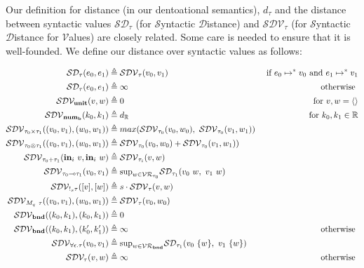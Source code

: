 Our definition for distance (in our dentoational semantics), $d_\tau$ and the
distance between syntactic values $\mathcal{SD}_\tau$ (for $\mathcal{S}$yntactic
$\mathcal{D}$istance) and $\mathcal{SDV}_\tau$ (for $\mathcal{S}$yntactic
$\mathcal{D}$istance for $\mathcal{V}$alues) are closely related. Some care is
needed to ensure that it is well-founded. We define our distance over syntactic
values as follows:

\begin{definition}
  \begin{equation}
  \begin{aligned}[c]
    \mathcal{SD_{\tau}}(e_0, e_1) &\triangleq \mathcal{SDV}_{\tau}(v_0, v_1)
    &\text{ if } e_0 \mapsto^{*} v_0 \text{ and } e_1 \mapsto^{*} v_1 \\
    \mathcal{SD_{\tau}}(e_0, e_1) &\triangleq \infty &\text{ otherwise } \\
    \mathcal{SDV_{\mathbf{unit}}}(v, w) &\triangleq 0 &\text{ for } v, w =
      \langle \rangle \\
    \mathcal{SDV}_{\mathbf{num_{b}}}(k_0, k_1) &\triangleq 
      d_\mathbb{R} &\text{ for } k_0, k_1 \in \mathbb{R} \\
    \mathcal{SDV}_{\tau_0 \times \tau_1}((v_0, v_1), (w_0, w_1)) 
      &\triangleq max(\mathcal{SDV}_{\tau_0}(v_0, w_0),~\mathcal{SDV}_{\tau_0}(v_1, w_1))
    \\
    \mathcal{SDV}_{\tau_0 \otimes \tau_1}((v_0, v_1), (w_0, w_1)) 
      &\triangleq \mathcal{SDV}_{\tau_0}(v_0, w_0) + \mathcal{SDV}_{\tau_0}(v_1, w_1))
    \\
    \mathcal{SDV}_{\tau_0 + \tau_1}(\textbf{in}_i~v, \textbf{in}_i~w) 
      &\triangleq \mathcal{SDV}_{\tau_i}(v, w)
    \\
    \mathcal{SDV}_{\tau_0 \multimap \tau_1}(v_0, v_1) 
      &\triangleq \text{sup}_{w \in \mathcal{VR}_{\tau_0}} \mathcal{SD}_{\tau_1}(v_0~w,~v_1~w)
    \\
    \mathcal{SDV}_{!_s \tau}([v], [w]) 
      &\triangleq s \cdot \mathcal{SDV}_{\tau}(v, w)
    \\
    \mathcal{SDV}_{M_q~\tau}((v_0, v_1), (w_0, w_1)) 
      &\triangleq \mathcal{SDV}_{\tau}(v_0, w_0)
    \\
    \mathcal{SDV}_{\textbf{bnd}}((k_0, k_1), (k_0, k_1)) 
      &\triangleq 0 
    \\
    \mathcal{SDV}_{\textbf{bnd}}((k_0, k_1), (k'_0, k'_1)) 
      &\triangleq \infty &\text{ otherwise }
    \\
    \mathcal{SDV}_{\forall \epsilon . \tau}(v_0, v_1) 
      &\triangleq \text{sup}_{w \in \mathcal{VR}_{\textbf{bnd}}} 
      \mathcal{SD}_{\tau_1}(v_0~\{w\},~v_1~\{w\})
    \\
    \mathcal{SDV_{\tau}}(v, w) &\triangleq \infty &\text{ otherwise } \\
  \end{aligned}
  \end{equation}
\end{definition}

